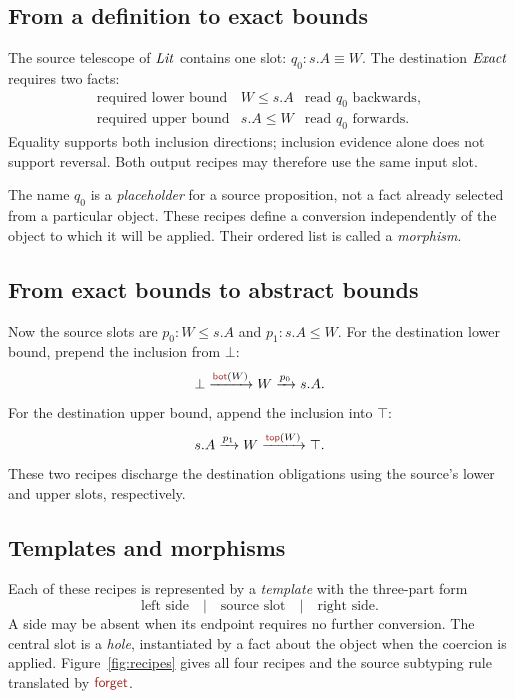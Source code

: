 \subsection*{From a definition to exact bounds}
The source telescope of $\mathit{Lit}$ contains one slot:
$q_0:s.A\equiv W$. The destination $\mathit{Exact}$ requires two facts:
\[
 \begin{array}{lll}
 \text{required lower bound}&W\le s.A&
       \text{read }q_0\text{ backwards},\\
 \text{required upper bound}&s.A\le W&
       \text{read }q_0\text{ forwards}.
 \end{array}
\]
Equality supports both inclusion directions; inclusion evidence alone
does not support reversal. Both output recipes may therefore use the
same input slot.

The name $q_0$ is a \emph{placeholder} for a source proposition, not a
fact already selected from a particular object. These recipes define a
conversion independently of the object to which it will be applied.
Their ordered list is called a \emph{morphism}.

\subsection*{From exact bounds to abstract bounds}
Now the source slots are
$p_0:W\le s.A$ and $p_1:s.A\le W$.
For the destination lower bound, prepend the inclusion from $\bot$:
\[
 \bot\xrightarrow{\ev{bot}(W)}W
      \xrightarrow{p_0}s.A.
\]
For the destination upper bound, append the inclusion into $\top$:
\[
 s.A\xrightarrow{p_1}W
      \xrightarrow{\ev{top}(W)}\top.
\]
These two recipes discharge the destination obligations using the
source's lower and upper slots, respectively.

\subsection*{Templates and morphisms}
Each of these recipes is represented by a \emph{template} with the three-part form
\[
 \boxed{\text{left side}\quad|\quad\text{source slot}\quad|\quad\text{right side}}.
\]
A side may be absent when its endpoint requires no further conversion.
The central slot is a \emph{hole}, instantiated by a fact about the
object when the coercion is applied. Figure~\ref{fig:recipes} gives all
four recipes and the source subtyping rule translated by $\ev{forget}$.



